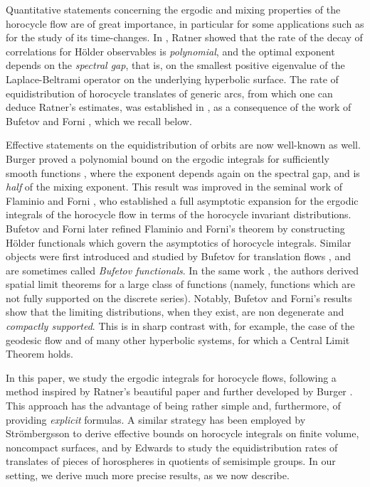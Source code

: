 \documentclass[11pt]{article}
\theoremstyle{definition}
\begin{document}
Quantitative statements concerning the ergodic and mixing properties of the horocycle flow are of great importance, in particular for some applications such as for the study of its time-changes.
In \cite{Rat1}, Ratner showed that the rate of the decay of correlations for Hölder observables is \emph{polynomial}, and the optimal exponent depends on the \emph{spectral gap}, that is, on the smallest positive eigenvalue of the Laplace-Beltrami operator on the underlying hyperbolic surface. The rate of equidistribution of horocycle translates of generic arcs, from which one can deduce Ratner's estimates, was established in \cite{Rav}, as a consequence of the work of Bufetov and Forni \cite{BuFo}, which we recall below.

Effective statements on the equidistribution of orbits are now well-known as well.
Burger proved a polynomial bound on the ergodic integrals for sufficiently smooth functions \cite{Bur}, where the exponent depends again on the spectral gap, and is \emph{half} of the mixing exponent.
This result was improved in the seminal work of Flaminio and Forni \cite{FlaFo}, who established a full asymptotic expansion for the ergodic integrals of the horocycle flow in terms of the horocycle invariant distributions.
Bufetov and Forni \cite{BuFo} later refined Flaminio and Forni's theorem by constructing Hölder functionals which govern the asymptotics of horocycle integrals.
Similar objects were first introduced and studied by Bufetov for translation flows \cite{Buf}, and are sometimes called \emph{Bufetov functionals}.
In the same work \cite{BuFo}, the authors derived spatial limit theorems for a large class of functions (namely, functions which are not fully supported on the discrete series).
Notably, Bufetov and Forni's results show that the limiting distributions, when they exist, are non degenerate and \emph{compactly supported}. This is in sharp contrast with, for example, the case of the geodesic flow and of many other hyperbolic systems, for which a Central Limit Theorem holds.

In this paper, we study the ergodic integrals for horocycle flows, following a method inspired by Ratner's beautiful paper \cite{Rat1} and further developed by Burger \cite{Bur}. This approach has the advantage of being rather simple and, furthermore, of providing \emph{explicit} formulas. A similar strategy has been employed by Strömbergsson \cite{Str} to derive effective bounds on horocycle integrals on finite volume, noncompact surfaces, and by Edwards \cite{Edw} to study the equidistribution rates of translates of pieces of horospheres in quotients of semisimple groups. In our setting, we derive much more precise results, as we now describe.\enlargethispage{\baselineskip}
\end{document}
